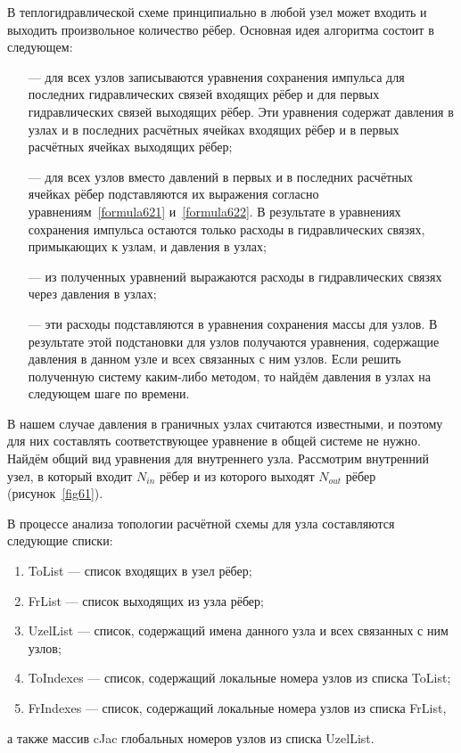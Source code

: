 
\label{sec:subsection62}
В теплогидравлической схеме принципиально в любой узел может входить и выходить произвольное количество рёбер. Основная идея алгоритма состоит в следующем:
\begin{itemize}[topsep=5pt, itemsep=-3pt]
\item[---] для всех узлов записываются уравнения сохранения импульса для последних гидравлических связей входящих рёбер и для первых гидравлических связей выходящих рёбер. Эти уравнения содержат давления в узлах и в последних расчётных ячейках входящих рёбер и в первых расчётных ячейках выходящих рёбер;
\item[---] для всех узлов вместо давлений в первых и в последних расчётных ячейках рёбер подставляются их выражения согласно уравнениям~\eqref{formula621} и~\eqref{formula622}. В результате в уравнениях сохранения импульса остаются только расходы в гидравлических связях, примыкающих к узлам, и давления в узлах;
\item[---] из полученных уравнений выражаются расходы в гидравлических связях через давления в узлах;
\item[---] эти расходы подставляются в уравнения сохранения массы для узлов. В результате этой подстановки для узлов получаются уравнения, содержащие давления в данном узле и всех связанных с ним узлов. Если решить полученную систему каким-либо методом, то найдём давления в узлах на следующем шаге по времени.	
\end{itemize} 

В нашем случае давления в граничных узлах считаются известными, и поэтому для них составлять соответствующее уравнение в общей системе не нужно. Найдём общий вид уравнения для внутреннего узла. Рассмотрим внутренний узел, в который входит $N_{in}$ рёбер и из которого выходят $N_{out}$ рёбер (рисунок~\ref{fig61}). 

\begin{figure}
\abovecaptionskip=2pt
\end{figure}

В процессе анализа топологии расчётной схемы для узла составляются следующие списки:
\begin{enumerate}[topsep=5pt, itemsep=-3pt]
\item ToList --- список входящих в узел рёбер;
\item FrList --- список выходящих из узла рёбер;
\item UzelList --- список, содержащий имена данного узла и всех связанных с ним узлов;
\item ToIndexes --- список, содержащий локальные номера узлов из списка ToList;
\item FrIndexes --- список, содержащий локальные номера узлов из списка FrList,
\end{enumerate}
а также массив cJac глобальных номеров узлов из списка UzelList.

